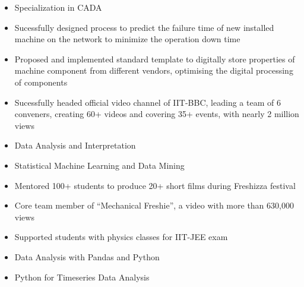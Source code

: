 \documentclass[10pt,a4paper,ragged2e,withhyper]{altacv}
\begin{document}
\begin{paracol}{2}
\switchcolumn

\label{sec:orga515844}

\divider

\divider


\label{sec:org3250eca}
\begin{itemize}
\item Specialization in CADA
\item Sucessfully designed process to predict the failure time of new installed machine on the network to minimize the operation down time
\item Proposed and implemented standard template to digitally store properties of machine component from different vendors, optimising the digital processing of components
\end{itemize}

\divider
{}
\begin{itemize}
\item Sucessfully headed official video channel of IIT-BBC, leading a team of 6 conveners, creating 60+ videos and covering 35+ events, with nearly 2 million views
\item Data Analysis and Interpretation
\item Statistical Machine Learning and Data Mining
\end{itemize}



\label{sec:org029ad46}

\begin{itemize}
\item Mentored 100+ students to produce 20+ short films during Freshizza festival
\item Core team member of ``Mechanical Freshie'', a video with more than 630,000 views
\item Supported students with physics classes for IIT-JEE exam
\end{itemize}

\label{sec:orga9fa4ec}

\begin{itemize}
\item Data Analysis with Pandas and Python
\item Python for Timeseries Data Analysis
\end{itemize}

\end{paracol}
\end{document}
